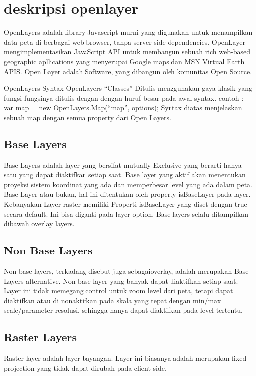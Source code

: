 
\section{deskripsi openlayer}
  OpenLayers adalah library Javascript murni yang digunakan untuk menampilkan data peta di berbagai web browser, tanpa server side dependencies.
  OpenLayer mengimplementasikan JavaScript API untuk membangun sebuah rich web-based geographic apllications yang menyerupai Google maps dan MSN Virtual Earth APIS.
  Open Layer adalah Software, yang dibangun oleh komunitas Open Source.
  
  OpenLayers Syntax
  OpenLayers “Classes”
  Ditulis menggunakan gaya klasik yang fungsi-fungsinya ditulis dengan dengan huruf besar pada awal syntax.
  contoh : var map = new OpenLayers.Map(“map”, options);
  Syntax diatas menjelaskan sebuah map dengan semua property dari Open Layers. 
  
\subsection{Base Layers}
 Base Layers adalah layer yang bersifat mutually Exclusive yang berarti hanya satu yang dapat diaktifkan setiap saat.
 Base layer yang aktif akan menentukan proyeksi sistem koordinat yang ada dan memperbesar level yang ada dalam peta. 
 Base Layer atau bukan, hal ini ditentukan oleh property isBaseLayer pada layer. Kebanyakan Layer raster memiliki Properti isBaseLayer yang diset dengan true secara default. 
 Ini bisa diganti pada layer option. Base layers selalu ditampilkan dibawah overlay layers.

\subsection{Non Base Layers}
Non base layers, terkadang disebut juga sebagaioverlay, adalah merupakan Base Layers alternative. Non-base layer yang banyak dapat diaktifkan setiap saat. Layer ini tidak memegang control untuk zoom level dari peta,
tetapi dapat diaktifkan atau di nonaktifkan pada skala yang tepat dengan min/max scale/parameter resolusi, sehingga hanya dapat diaktifkan pada level tertentu.

\subsection {Raster Layers}
Raster layer adalah layer bayangan. Layer ini biasanya adalah merupakan fixed projection yang tidak dapat dirubah pada client side.

